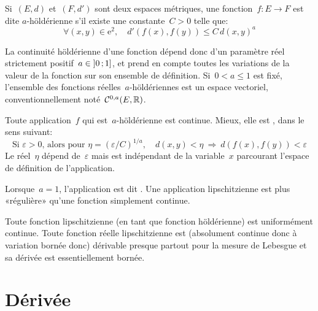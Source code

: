 \medskip
\begin{definition}
Si~$(E, d)$ et~$(F, d')$ sont deux espaces métriques, une fonction~$f: E \rightarrow F$ est dite $a$-höldérienne s'il existe une constante~$C > 0$ telle que:
\begin{equation}
  \forall (x, y) \in \mathrm{e}^2,\quad d'\left(f(x), f(y)\right) \le C\,d\left(x,y\right)^a
\end{equation}
\end{definition}
La continuité höldérienne d'une fonction dépend donc d'un paramètre réel strictement positif~$a \in \mathopen{]}0\,;1\mathclose{]}$, et prend en compte toutes les variations de la valeur de la fonction sur son ensemble de définition.
\parvm
Si~$0 < a \le 1$ est fixé, l'ensemble des fonctions réelles~$a$-höldériennes est un espace vectoriel, conventionnellement noté~$\mathcal{C}^{0, a}(E,\mathbb R)$.

\medskip
\begin{theoreme}
Toute application~$f$ qui est~$a$-höldérienne est continue. Mieux, elle est , dans le sens suivant:
\begin{equation}
\text{Si } \varepsilon>0\text{, alors pour } \eta = \left( \varepsilon / C \right)^{1 / a},\quad d\left( x, y \right) < \eta \ \Rightarrow\ d\left( f(x), f(y) \right) < \varepsilon
\end{equation}
Le réel~$\eta$ dépend de~$\varepsilon$ mais est indépendant de la variable~$x$ parcourant l'espace de définition de l'application.
\end{theoreme}
\medskipvm
\begin{definition}
Lorsque~$a = 1$, l'application est dit .
Une application lipschitzienne est plus «régulière» qu'une fonction simplement continue.
\end{definition}
Toute fonction lipschitzienne (en tant que fonction höldérienne) est uniformément continue.
\parvm
Toute fonction réelle lipschitzienne est (absolument continue donc à variation bornée donc) dérivable presque partout pour la mesure de Lebesgue et sa dérivée est essentiellement bornée.

\medskip
\section{Dérivée}

